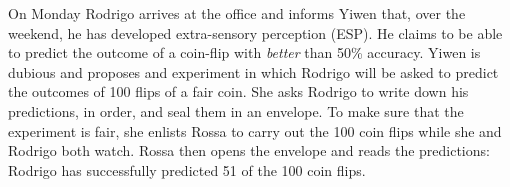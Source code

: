 \documentclass[addpoints,12pt]{exam}
\begin{document}
\begin{questions}

\newpage

\question On Monday Rodrigo arrives at the office and informs Yiwen that, over the weekend, he has developed extra-sensory perception (ESP). 
He claims to be able to predict the outcome of a coin-flip with \emph{better} than 50\% accuracy.
Yiwen is dubious and proposes and experiment in which Rodrigo will be asked to predict the outcomes of 100 flips of a fair coin.
She asks Rodrigo to write down his predictions, in order, and seal them in an envelope.
To make sure that the experiment is fair, she enlists Rossa to carry out the 100 coin flips while she and Rodrigo both watch. 
Rossa then opens the envelope and reads the predictions: Rodrigo has successfully predicted 51 of the 100 coin flips. 
\begin{parts}

\end{parts}
\end{questions}
\end{document}
